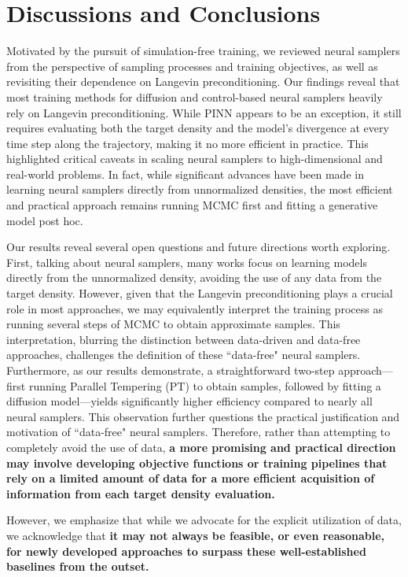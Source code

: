 \section{Discussions and Conclusions}
Motivated by the pursuit of simulation-free training, we reviewed neural samplers from the perspective of sampling processes and training objectives, as well as revisiting their dependence on Langevin preconditioning.
Our findings reveal that most training methods for diffusion and control-based neural samplers heavily rely on Langevin preconditioning.
While PINN appears to be an exception, it still requires evaluating both the target density and the model’s divergence at every time step along the trajectory, making it no more efficient in practice.
This highlighted critical caveats in scaling neural samplers to high-dimensional and real-world problems.
In fact, while significant advances have been made in learning neural samplers directly from unnormalized densities, the most efficient and practical approach remains running MCMC first and fitting a generative model post hoc.
\par
Our results reveal several open questions and future directions worth exploring.
First, talking about neural samplers, many works focus on learning models directly from the unnormalized density, avoiding the use of any data from the target density. 
However, given that the Langevin preconditioning plays a crucial role in most approaches, we may equivalently interpret the training process as running several steps of MCMC to obtain approximate samples.
This interpretation, blurring the distinction between data-driven and data-free approaches,  challenges the definition of these ``data-free" neural samplers.
 Furthermore, as our results demonstrate, a straightforward two-step approach---first running Parallel Tempering (PT) to obtain samples, followed by fitting a diffusion model---yields significantly higher efficiency compared to nearly all neural samplers.
This observation further questions the practical justification and motivation of ``data-free" neural samplers.
Therefore, rather than attempting to completely avoid the use of data, \textbf{a more promising and practical direction may involve developing objective functions or training pipelines that rely on a limited amount of data for a more efficient acquisition of information from each target density evaluation.}
\par
However, we emphasize that while we advocate for the explicit utilization of data, we acknowledge that \textbf{it may not always be feasible, or even reasonable, for newly developed approaches to surpass these well-established baselines from the outset.}
